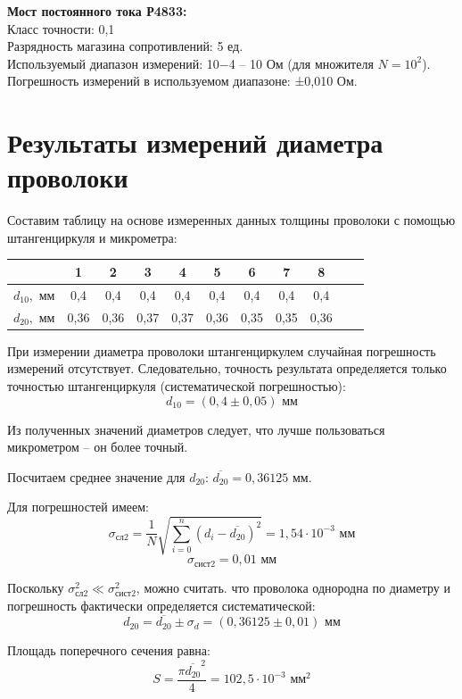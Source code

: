 \textbf{Мост постоянного тока Р4833:}\\
Класс точности: 0,1\\
Разрядность магазина сопротивлений: 5 ед.\\
Используемый диапазон измерений: 10−4 – 10 Ом (для множителя $N = 10^2$).
Погрешность измерений в используемом диапазоне: ±0,010 Ом.


\newpage

\section{Результаты измерений диаметра проволоки}


Составим таблицу на основе измеренных данных толщины проволоки с помощью штангенциркуля и микрометра:

\begin{center}
\begin{tabular}{|c|c|c|c|c|c|c|c|c|c|c|}
\hline 
 & 1 & 2 & 3 & 4 & 5 & 6 & 7 & 8  \\ 
\hline 
$d_{10},$ мм & 0,4 & 0,4 & 0,4 & 0,4 & 0,4 & 0,4 & 0,4 & 0,4\\ 
\hline 
$d_{20},$ мм & 0,36 & 0,36 & 0,37 & 0,37 & 0,36 & 0,35 & 0,35 & 0,36\\ 
\hline 
\end{tabular} 
\end{center}

При измерении диаметра проволоки штангенциркулем случайная погрешность измерений отсутствует. Следовательно, точность результата определяется только точностью штангенциркуля (систематической погрешностью):
\[d_{10} = (0,4 \pm 0,05) \text{ мм}\]

Из полученных значений диаметров следует, что лучше пользоваться микрометром -- он более точный.

Посчитаем среднее значение для $d_{20}$: $\overline{d_{20}} = 0,36125$ мм.

Для погрешностей имеем:
\[\sigma_{\text{сл}2} = \frac{1}{N}\sqrt{\sum_{i = 0}^{n}{(d_i-\overline{d_{20}})^2}} = 1,54\cdot 10^{-3} \text{ мм}\] 
\[\sigma_{\text{сист}2} = 0,01 \text{ мм}\]

Поскольку $\sigma_{\text{сл}2}^2 \ll \sigma_{\text{сист}2}^2$, можно считать. что проволока однородна по диаметру и погрешность фактически определяется систематической:
\[d_{20} = \overline{d_{20}} \pm \sigma_d = (0,36125 \pm 0,01) \text{ мм}\]

Площадь поперечного сечения равна:
\[S = \frac{\pi \overline{d_{20}}^2}{4} = 102,5\cdot 10^{-3}\text{ мм}^{2}\]

